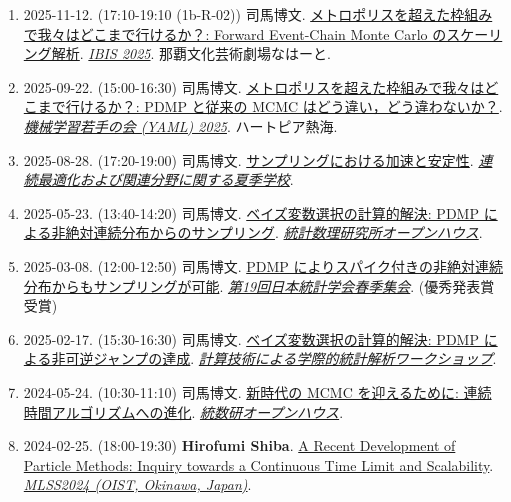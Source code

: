 \documentclass[
  11pt,
]{article}
\begin{document}
\begin{enumerate}
  \emph{\href{https://www3.stat.sinica.edu.tw/3ijc2026/}{ISI-ISM-ISSAS
  Joint Conference}}. Academia Sinica, Taiwan (2nd Conference Room, 3F).
\item
  2025-11-12. (17:10-19:10 (1b-R-02)) 司馬博文.
  \href{https://162348.github.io/posts/2025/Posters/IBIS.html}{メトロポリスを超えた枠組みで我々はどこまで行けるか？:
  Forward Event-Chain Monte Carlo のスケーリング解析}.
  \emph{\href{https://ibisml.org/ibis2025/posters/}{IBIS 2025}}.
  那覇文化芸術劇場なはーと.
\item
  2025-09-22. (15:00-16:30) 司馬博文.
  \href{https://162348.github.io/posts/2025/Posters/FECMC.html}{メトロポリスを超えた枠組みで我々はどこまで行けるか？:
  PDMP と従来の MCMC はどう違い，どう違わないか？}.
  \emph{\href{https://sites.google.com/view/yaml2025/}{機械学習若手の会
  (YAML) 2025}}. ハートピア熱海.
\item
  2025-08-28. (17:20-19:00) 司馬博文.
  \href{https://162348.github.io/posts/2025/Posters/Acceleration.html}{サンプリングにおける加速と安定性}.
  \emph{\href{https://www.ism.ac.jp/~mirai/sscoke/2025/}{連続最適化および関連分野に関する夏季学校}}.
\item
  2025-05-23. (13:40-14:20) 司馬博文.
  \href{https://162348.github.io/posts/2025/Posters/OH.html}{ベイズ変数選択の計算的解決:
  PDMP による非絶対連続分布からのサンプリング}.
  \emph{\href{https://www.ism.ac.jp/openhouse/}{統計数理研究所オープンハウス}}.
\item
  2025-03-08. (12:00-12:50) 司馬博文.
  \href{https://162348.github.io/posts/2025/Posters/NewRegime.html}{PDMP
  によりスパイク付きの非絶対連続分布からもサンプリングが可能}.
  \emph{\href{https://jss2025spring.ywstat.jp/}{第19回日本統計学会春季集会}}.
  (優秀発表賞受賞)
\item
  2025-02-17. (15:30-16:30) 司馬博文.
  \href{https://162348.github.io/posts/2025/Posters/Sticky.html}{ベイズ変数選択の計算的解決:
  PDMP による非可逆ジャンプの達成}.
  \emph{\href{https://okuno.net/events/ISACT2025\#poster-speakers}{計算技術による学際的統計解析ワークショップ}}.
\item
  2024-05-24. (10:30-11:10) 司馬博文.
  \href{https://162348.github.io/posts/2024/Posters/OH.html}{新時代の
  MCMC を迎えるために: 連続時間アルゴリズムへの進化}.
  \emph{\href{https://www.ism.ac.jp/openhouse/2024/index.html}{統数研オープンハウス}}.
\item
  2024-02-25. (18:00-19:30) \textbf{Hirofumi Shiba}.
  \href{https://162348.github.io/posts/2024/Posters/RecentDevelopment.html}{A
  Recent Development of Particle Methods: Inquiry towards a Continuous
  Time Limit and Scalability}.
  \emph{\href{https://groups.oist.jp/mlss}{MLSS2024 (OIST, Okinawa,
  Japan)}}.
\end{enumerate}
\end{document}
